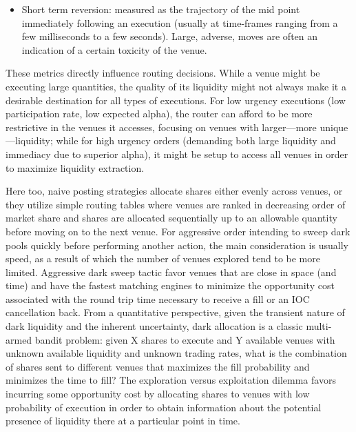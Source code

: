 \begin{itemize}
\begin{itemize}
\item Short term reversion: measured as the trajectory of the mid point immediately following an execution (usually at time-frames ranging from a few milliseconds to a few seconds). Large, adverse, moves are often an indication of a certain toxicity of the venue. 
\end{itemize}


These metrics directly influence routing decisions. While a venue might be executing large quantities, the quality of its liquidity might not always make it a desirable destination for all types of executions. For low urgency executions (low participation rate, low expected alpha), the router can afford to be more restrictive in the venues it accesses, focusing on venues with larger---more unique---liquidity; while for high urgency orders (demanding both large liquidity and immediacy due to superior alpha), it might be setup to access all venues in order to maximize liquidity extraction.


Here too, naive posting strategies allocate shares either evenly across venues, or they utilize simple routing tables where venues are ranked in decreasing order of market share and shares are allocated sequentially up to an allowable quantity before moving on to the next venue. For aggressive order intending to sweep dark pools quickly before performing another action, the main consideration is usually speed, as a result of which the number of venues explored tend to be more limited. Aggressive dark sweep tactic favor venues that are close in space (and time) and have the fastest matching engines to minimize the opportunity cost associated with the round trip time necessary to receive a fill or an IOC cancellation back. From a quantitative perspective, given the transient nature of dark liquidity and the inherent uncertainty, dark allocation is a classic multi-armed bandit problem: given X shares to execute and Y available venues with unknown available liquidity and unknown trading rates, what is the combination of shares sent to different venues that maximizes the fill probability and minimizes the time to fill? The exploration versus exploitation dilemma favors incurring some opportunity cost by allocating shares to venues with low probability of execution in order to obtain information about the potential presence of liquidity there at a particular point in time.



\end{itemize}

